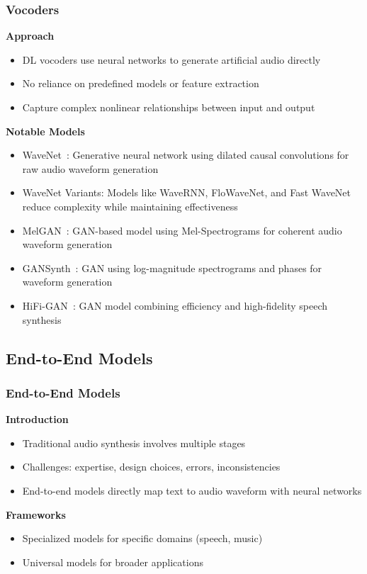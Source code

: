 \begin{frame}
    \frametitle{Vocoders}

    \textbf{Approach}
    \begin{itemize}
        \item DL vocoders use neural networks to generate artificial audio directly
        \item No reliance on predefined models or feature extraction
        \item Capture complex nonlinear relationships between input and output
    \end{itemize}

    \textbf{Notable Models}
    \begin{itemize}
        \item WaveNet~\cite{oord_wavenet_2016}: Generative neural network using dilated causal convolutions for raw audio waveform generation
        \item WaveNet Variants: Models like WaveRNN, FloWaveNet, and Fast WaveNet reduce complexity while maintaining effectiveness
        \item MelGAN~\cite{kumar_melgan_2019}: GAN-based model using Mel-Spectrograms for coherent audio waveform generation
        \item GANSynth~\cite{engel_gansynth_2019}: GAN using log-magnitude spectrograms and phases for waveform generation
        \item HiFi-GAN~\cite{kong_hifi-gan_2020}: GAN model combining efficiency and high-fidelity speech synthesis
    \end{itemize}
\end{frame}


\subsection{End-to-End Models}

\begin{frame}
    \frametitle{End-to-End Models}

    \textbf{Introduction}
    \begin{itemize}
        \item Traditional audio synthesis involves multiple stages
        \item Challenges: expertise, design choices, errors, inconsistencies
        \item End-to-end models directly map text to audio waveform with neural networks
    \end{itemize}

    \textbf{Frameworks}
    \begin{itemize}
        \item Specialized models for specific domains (speech, music)
        \item Universal models for broader applications
    \end{itemize}

\end{frame}

